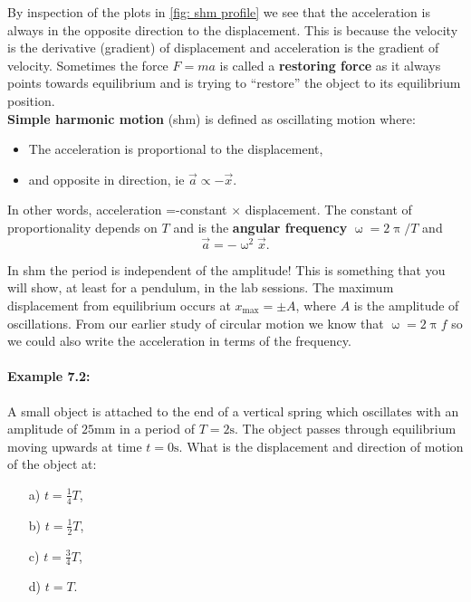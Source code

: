 \documentclass[a4paper,12pt]{book}
\begin{document}
By inspection of the plots in \cref{fig: shm profile} we see that the acceleration is always in the opposite direction to the displacement. This is because the velocity is the derivative (gradient) of displacement and acceleration is the gradient of velocity. Sometimes the force $F=ma$ is called a \textbf{restoring force} as it always points towards equilibrium and is trying to ``restore'' the object to its equilibrium position.\\

\textbf{Simple harmonic motion} (shm) is defined as oscillating motion where:
\begin{itemize}
\setlength{\itemsep}{-5pt}
    \item The acceleration is proportional to the displacement,
    \item and opposite in direction, ie $\vec{a}\propto -\vec{x}$.
\end{itemize} 
In other words, acceleration =-constant $\times$ displacement. The constant of proportionality depends on $T$ and is the \textbf{angular frequency} $\upomega=2\uppi/T$ and
\begin{equation}
\vec{a}=-\upomega^{2}\vec{x}.
\end{equation}

In shm the period is independent of the amplitude! This is something that you will show, at least for a pendulum, in the lab sessions. The maximum displacement from equilibrium occurs at $x_{\text{max}}=\pm A$, where $A$ is the amplitude of oscillations. From our earlier study of circular motion we know that $\upomega=2\uppi f$ so we could also write the acceleration in terms of the frequency.\\

\paragraph{Example 7.2:} A small object is attached to the end of a vertical spring which oscillates with an amplitude of $25\text{mm}$ in a period of $T=2\text{s}$. The object passes through equilibrium moving upwards at time $t=0\text{s}$. What is the displacement and direction of motion of the object at:
\begin{itemize}
\setlength{\itemsep}{-5pt}
    \item[a)] $t=\frac{1}{4}T$,
    \item[b)] $t=\frac{1}{2}T$,
    \item[c)] $t=\frac{3}{4}T$,
    \item[d)] $t=T$.
\end{itemize}  
\end{document}
